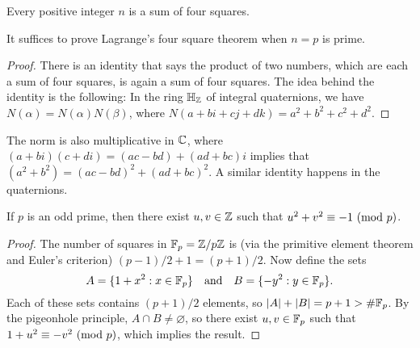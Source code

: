 \begin{theorem}\label{thm:lagrange-squares}
  Every positive integer $n$ is a sum of four squares.
\end{theorem}

\begin{lemma}
  It suffices to prove Lagrange's four square theorem
  when $n = p$ is prime.
\end{lemma}

\begin{proof}
  There is an identity that says the product of two numbers,
  which are each a sum of four squares, is again a sum of
  four squares. The idea behind the identity is the following:
  In the ring $\mathbb{H}_{\mathbb{Z}}$ of integral quaternions, we have
  $N(\alpha) = N(\alpha) N(\beta)$, where
  $N(a + bi + cj + dk) = a^2 + b^2 + c^2 + d^2$.
\end{proof}

\begin{remark}
  The norm is also multiplicative in $\mathbb{C}$, where
  $(a + bi)(c + di) = (ac - bd) + (ad + bc)i$
  implies that $(a^2 + b^2) = (ac - bd)^2 + (ad + bc)^2$.
  A similar identity happens in the quaternions.
\end{remark}

\begin{lemma}
  If $p$ is an odd prime, then there exist $u,v \in \mathbb{Z}$
  such that $u^2 + v^2 \equiv -1 \ (\mathrm{mod}\ p)$.
\end{lemma}

\begin{proof}
  The number of squares in $\mathbb{F}_p = \mathbb{Z} / p\mathbb{Z}$ is
  (via the primitive element theorem and Euler's criterion)
  $(p - 1) / 2 + 1 = (p + 1) / 2$.
  Now define the sets
  \[
    A = \{1 + x^2 : x \in \mathbb{F}_p\} \quad \text{and} \quad
    B = \{-y^2 : y \in \mathbb{F}_p\}.
  \]
  Each of these sets contains $(p + 1) / 2$ elements, so
  $|A| + |B| = p + 1 > \#\mathbb{F}_p$. By the pigeonhole principle,
  $A \cap B \ne \varnothing$, so there exist $u, v \in \mathbb{F}_p$
  such that $1 + u^2 \equiv -v^2 \ (\mathrm{mod}\ p)$, which
  implies the result.
\end{proof}

